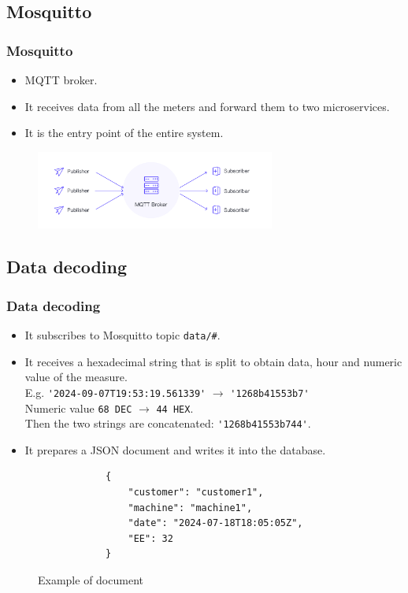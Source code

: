 \subsection{Mosquitto}
\begin{frame}
	\frametitle{Mosquitto}
	
	\begin{itemize}
		\item MQTT broker.
		\item It receives data from all the meters and forward them to two microservices.
		\item It is the entry point of the entire system.
	\end{itemize}
	
	\begin{figure}[h]
		\centering
		\includegraphics[width=0.7\textwidth]{./img/mqttBroker.png}
	\end{figure}
\end{frame}


\subsection{Data decoding}
\begin{frame}[containsverbatim]
	\frametitle{Data decoding}
	
	\begin{itemize}
		\item It subscribes to Mosquitto topic \verb|data/#|.
		\item It receives a hexadecimal string that is split to obtain data, hour and numeric value of the measure.\\
		E.g. \verb|'2024-09-07T19:53:19.561339'| $\rightarrow$ \verb|'1268b41553b7'|\\
		Numeric value \verb|68 DEC| $\rightarrow$ \verb|44 HEX|.\\
		Then the two strings are concatenated: \verb|'1268b41553b744'|.
		\item It prepares a JSON document and writes it into the database.
	\end{itemize}
	
	\begin{figure}[h]
		\centering
		\begin{verbatim}
			{
				"customer": "customer1",
				"machine": "machine1",
				"date": "2024-07-18T18:05:05Z",
				"EE": 32
			}
		\end{verbatim}
		\caption{Example of document}
	\end{figure}
	
\end{frame}


